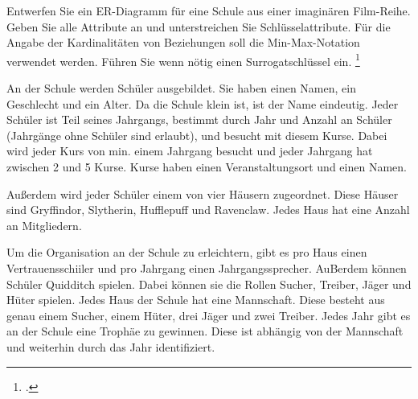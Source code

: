 \documentclass{bschlangaul-aufgabe}
\begin{document}

Entwerfen Sie ein ER-Diagramm für eine Schule aus einer imaginären
Film-Reihe. Geben Sie alle Attribute an und unterstreichen Sie
Schlüsselattribute. Für die Angabe der Kardinalitäten von Beziehungen
soll die Min-Max-Notation verwendet werden. Führen Sie wenn nötig einen
Surrogatschlüssel ein.
\footcite[Thema 1 Teilaufgabe 2 Aufgabe 2]{examen:66116:2019:09}

An der Schule werden Schüler ausgebildet. Sie haben einen Namen, ein
Geschlecht und ein Alter. Da die Schule klein ist, ist der Name
eindeutig. Jeder Schüler ist Teil seines Jahrgangs, bestimmt durch Jahr
und Anzahl an Schüler (Jahrgänge ohne Schüler sind erlaubt), und besucht
mit diesem Kurse. Dabei wird jeder Kurs von min. einem Jahrgang besucht
und jeder Jahrgang hat zwischen 2 und 5 Kurse. Kurse haben einen
Veranstaltungsort und einen Namen.

Außerdem wird jeder Schüler einem von vier Häusern zugeordnet. Diese
Häuser sind Gryffindor, Slytherin, Hufflepuff und Ravenclaw. Jedes Haus
hat eine Anzahl an Mitgliedern.

Um die Organisation an der Schule zu erleichtern, gibt es pro Haus einen
Vertrauensschiiler und pro Jahrgang einen Jahrgangssprecher. AuBerdem
können Schüler Quidditch spielen. Dabei können sie die Rollen Sucher,
Treiber, Jäger und Hüter spielen. Jedes Haus der Schule hat eine
Mannschaft. Diese besteht aus genau einem Sucher, einem Hüter, drei
Jäger und zwei Treiber. Jedes Jahr gibt es an der Schule eine Trophäe zu
gewinnen. Diese ist abhängig von der Mannschaft und weiterhin durch das
Jahr identifiziert.
\end{document}
